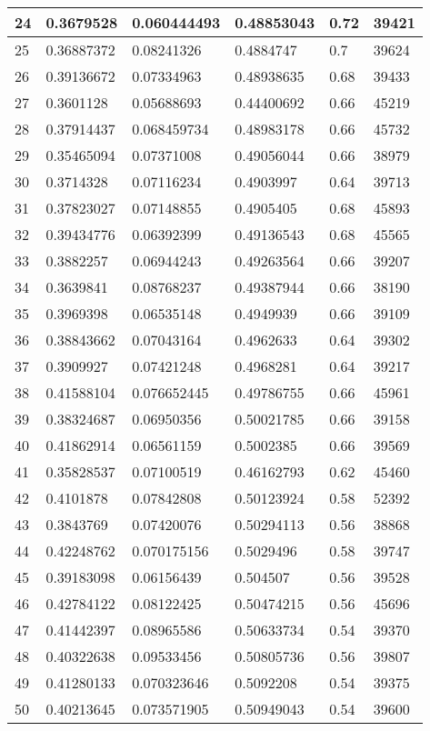 \begin{longtable}{|l|l|l|l|l|l|}
24 & 0.3679528 & 0.060444493 & 0.48853043 & 0.72 & 39421 \\ \hline 
25 & 0.36887372 & 0.08241326 & 0.4884747 & 0.7 & 39624 \\ \hline 
26 & 0.39136672 & 0.07334963 & 0.48938635 & 0.68 & 39433 \\ \hline 
27 & 0.3601128 & 0.05688693 & 0.44400692 & 0.66 & 45219 \\ \hline 
28 & 0.37914437 & 0.068459734 & 0.48983178 & 0.66 & 45732 \\ \hline 
29 & 0.35465094 & 0.07371008 & 0.49056044 & 0.66 & 38979 \\ \hline 
30 & 0.3714328 & 0.07116234 & 0.4903997 & 0.64 & 39713 \\ \hline 
31 & 0.37823027 & 0.07148855 & 0.4905405 & 0.68 & 45893 \\ \hline 
32 & 0.39434776 & 0.06392399 & 0.49136543 & 0.68 & 45565 \\ \hline 
33 & 0.3882257 & 0.06944243 & 0.49263564 & 0.66 & 39207 \\ \hline 
34 & 0.3639841 & 0.08768237 & 0.49387944 & 0.66 & 38190 \\ \hline 
35 & 0.3969398 & 0.06535148 & 0.4949939 & 0.66 & 39109 \\ \hline 
36 & 0.38843662 & 0.07043164 & 0.4962633 & 0.64 & 39302 \\ \hline 
37 & 0.3909927 & 0.07421248 & 0.4968281 & 0.64 & 39217 \\ \hline 
38 & 0.41588104 & 0.076652445 & 0.49786755 & 0.66 & 45961 \\ \hline 
39 & 0.38324687 & 0.06950356 & 0.50021785 & 0.66 & 39158 \\ \hline 
40 & 0.41862914 & 0.06561159 & 0.5002385 & 0.66 & 39569 \\ \hline 
41 & 0.35828537 & 0.07100519 & 0.46162793 & 0.62 & 45460 \\ \hline 
42 & 0.4101878 & 0.07842808 & 0.50123924 & 0.58 & 52392 \\ \hline 
43 & 0.3843769 & 0.07420076 & 0.50294113 & 0.56 & 38868 \\ \hline 
44 & 0.42248762 & 0.070175156 & 0.5029496 & 0.58 & 39747 \\ \hline 
45 & 0.39183098 & 0.06156439 & 0.504507 & 0.56 & 39528 \\ \hline 
46 & 0.42784122 & 0.08122425 & 0.50474215 & 0.56 & 45696 \\ \hline 
47 & 0.41442397 & 0.08965586 & 0.50633734 & 0.54 & 39370 \\ \hline 
48 & 0.40322638 & 0.09533456 & 0.50805736 & 0.56 & 39807 \\ \hline 
49 & 0.41280133 & 0.070323646 & 0.5092208 & 0.54 & 39375 \\ \hline 
50 & 0.40213645 & 0.073571905 & 0.50949043 & 0.54 & 39600 \\ \hline 
\end{longtable}